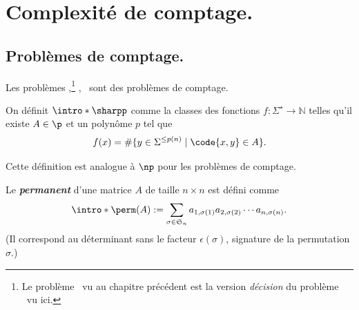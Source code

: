 \documentclass[./main]{subfiles}
\begin{document}
  \chapter{Complexité de comptage.}

  \section{Problèmes de comptage.}

  \begin{exm}
    Les problèmes \pbSharpSat,\footnote{Le problème \pbSharpSatD\ vu au chapitre précédent est la version \textit{décision} du problème \pbSharpSat\ vu ici.} \pbSharpCliques, \pbSharpCouplagesParfaits\ sont des problèmes de comptage.
    \showSharpSat
    \showSharpCliques
    \showSharpCouplagesParfaits
  \end{exm}

  \begin{defn}
    On définit $\intro*\sharpp$ comme la classes des fonctions $f : \Sigma^\star \to \mathds{N}$ telles qu'il existe $A \in \p$ et un polynôme $p$ tel que 
     \[
       f(x) = \# \{y \in \Sigma^{\le p(n)}  \mid \code{x,y} \in A\} 
    .\]
  \end{defn}

  Cette définition est analogue à $\np$ pour les problèmes de comptage.

  \begin{defn}
    Le \textit{\textbf{permanent}} d'une matrice $A$ de taille $n \times n$ est défini comme
    \[
      \intro*\perm(A) := \sum_{\sigma \in \mathfrak{S}_n} a_{1, \sigma(1)} a_{2,\sigma(2)} \cdots a_{n,\sigma(n)}
    .\]
    (Il correspond au déterminant sans le facteur $\epsilon(\sigma)$, signature de la permutation $\sigma$.)
  \end{defn}
\end{document}
